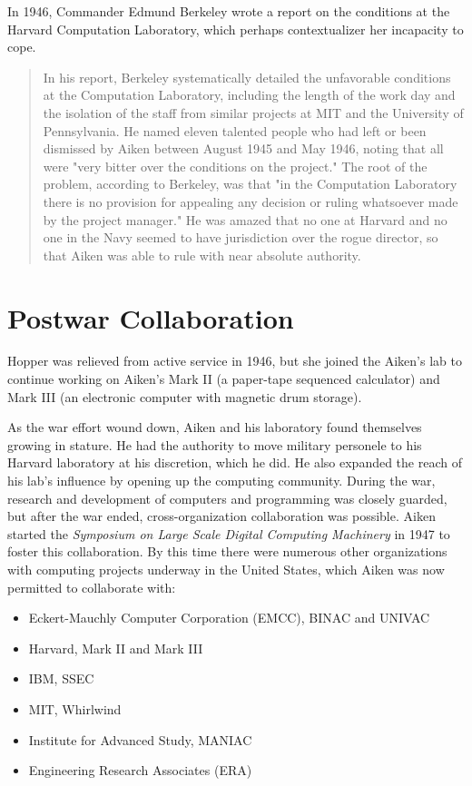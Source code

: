 In 1946, Commander Edmund Berkeley wrote a report on the conditions at the
Harvard Computation Laboratory, which perhaps contextualizer her incapacity to cope.
\begin{quotation}
In his report, Berkeley systematically detailed the unfavorable conditions at 
the Computation Laboratory, including the length of the work day and the 
isolation of the staff from similar projects at MIT and the University of 
Pennsylvania. He named eleven talented people who had left or been dismissed by 
Aiken between August 1945 and May 1946, noting that all were "very bitter over 
the conditions on the project." The root of the problem, according to Berkeley, 
was that "in the Computation Laboratory there is no provision for appealing any 
decision or ruling whatsoever made by the project manager." He was amazed that 
no one at Harvard and no one in the Navy seemed to have jurisdiction over the 
rogue director, so that Aiken was able to rule with near absolute authority.
\end{quotation}

\section{Postwar Collaboration}

Hopper was relieved from active service in 1946, but she joined the Aiken's lab
to continue working on Aiken's Mark II (a paper-tape sequenced calculator) and
Mark III (an electronic computer with magnetic drum storage).

As the war effort wound down, Aiken and his laboratory found themselves growing
in stature.
He had the authority to move military personele to his Harvard laboratory at
his discretion, which he did.
He also expanded the reach of his lab's influence by opening up the computing
community.
During the war, research and development of computers and programming was closely
guarded, but after the war ended, cross-organization collaboration was possible.
Aiken started the \textit{Symposium on Large Scale Digital Computing Machinery}
in 1947 to foster this collaboration.
By this time there were numerous other organizations with computing projects
underway in the United States, which Aiken was now permitted to collaborate with:

\begin{itemize}
    \item Eckert-Mauchly Computer Corporation (EMCC), BINAC and UNIVAC
    \item Harvard, Mark II and Mark III
    \item IBM, SSEC
    \item MIT, Whirlwind
    \item Institute for Advanced Study, MANIAC
    \item Engineering Research Associates (ERA)
\end{itemize}

